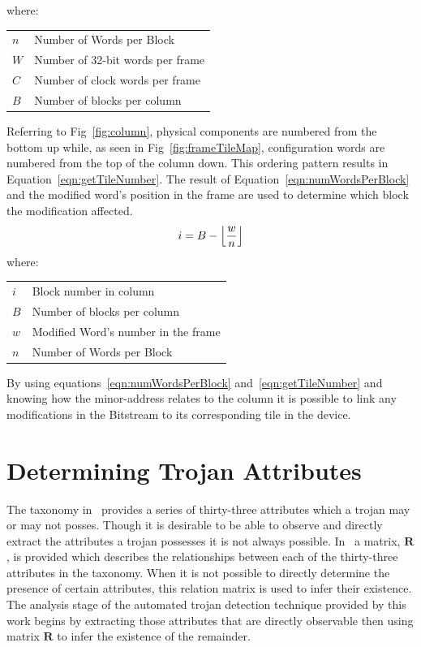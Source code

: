 \documentclass[journal, hidelinks]{IEEEtran}
\makeatletter
\newenvironment{conditions}
{\par\vspace{\abovedisplayskip}\noindent\begin{tabular}{>{$}l<{$} @{${}={}$} l}}
{\end{tabular}\par\vspace{\belowdisplayskip}}
\makeatother
\begin{document}
where:
\begin{conditions}
	n     &  Number of Words per Block \\
	W     &  Number of 32-bit words per frame \\   
	C     &  Number of clock words per frame \\
	B     &  Number of blocks per column
\end{conditions}
Referring to Fig~\ref{fig:column}, physical components are numbered from the bottom up while, as seen in Fig~\ref{fig:frameTileMap}, configuration words are numbered from the top of the column down.
This ordering pattern results in Equation~\ref{eqn:getTileNumber}.
The result of Equation~\ref{eqn:numWordsPerBlock} and the modified word's position in the frame are used to determine which block the modification affected.
\begin{equation} \label{eqn:getTileNumber}
i = B - \floor*{\frac{w}{n}}
\end{equation}
where:
\begin{conditions}
	i     &  Block number in column\\
	B     &  Number of blocks per column \\
	w     &  Modified Word's number in the frame\\
	n     &  Number of Words per Block 
\end{conditions}
By using equations~\ref{eqn:numWordsPerBlock} and~\ref{eqn:getTileNumber} and knowing how the minor-address relates to the column it is possible to link any modifications in the Bitstream to its corresponding tile in the device.


\section{Determining Trojan Attributes} \label{sec:trojanAttributes}
The taxonomy in~\cite{samerAttribute} provides a series of thirty-three attributes which a trojan may or may not posses.
Though it is desirable to be able to observe and directly extract the attributes a trojan possesses it is not always possible. 
In~\cite{samerAttribute} a matrix, $\mathbf{R}$, is provided which describes the relationships between each of the thirty-three attributes in the taxonomy.
When it is not possible to directly determine the presence of certain attributes, this relation matrix is used to infer their existence.
The analysis stage of the automated trojan detection technique provided by this work begins by extracting those attributes that are directly observable then using matrix $\mathbf{R}$ to infer the existence of the remainder. 
\end{document}
